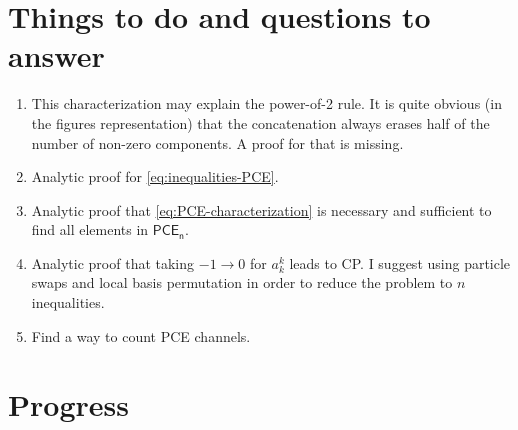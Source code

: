 \documentclass[11pt,dvipsnames]{article} %
\newcommand{\1}{\mathds{1}}
\newcommand{\PCE}[1]{\mathsf{PCE}_\mathsf{#1}}
\begin{document}
\section*{Things to do and questions to answer} %
\begin{enumerate}
\item This characterization may explain the power-of-2 rule. 
It is quite obvious (in the figures representation) that the concatenation
always erases half of the number of non-zero components. A proof 
for that is missing.
\item Analytic proof for \eqref{eq:inequalities-PCE}. 
\item Analytic proof that \eqref{eq:PCE-characterization} is necessary 
and sufficient to find all elements in $\PCE{n}$.
\item Analytic proof that taking $-1\to 0$ for $a_k^k$ leads to CP.
I suggest using particle swaps and local basis permutation in order 
to reduce the problem to $n$ inequalities.
\item Find a way to count PCE channels.
\end{enumerate}

\section*{Progress}
\end{document}
